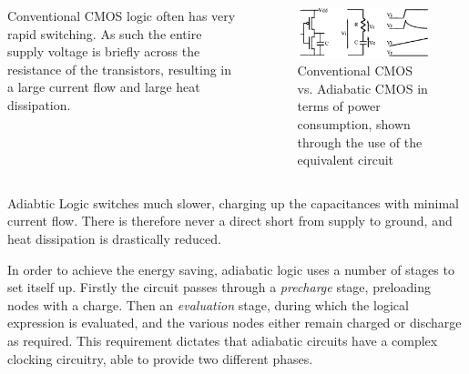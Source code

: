 \begin{columns}
	\begin{column}{0.49\textwidth}
		Conventional CMOS logic often has very rapid switching.
		As such the entire supply voltage is briefly across the resistance of the transistors, resulting in a large current flow and large heat dissipation.
	\end{column}
	\begin{column}{0.49\textwidth}
\begin{figure}
	\centering
	\includegraphics[width=\columnwidth]{../../images/conv_vs_adiabatic.png}
	\caption{Conventional CMOS vs. Adiabatic CMOS in terms of power consumption, shown through the use of the equivalent circuit \cite{DynAdiabatic} }
	\label{fig:convvsadia}
\end{figure}
	\end{column}
\end{columns}

Adiabtic Logic switches much slower, charging up the capacitances with minimal current flow.
There is therefore never a direct short from supply to ground, and heat dissipation is drastically reduced.

In order to achieve the energy saving, adiabatic logic uses a number of stages to set itself up.
Firstly the circuit passes through a \emph{precharge} stage, preloading nodes with a charge.
Then an \emph{evaluation} stage, during which the logical expression is evaluated, and the various nodes either remain charged or discharge as required.
This requirement dictates that adiabatic circuits have a complex clocking circuitry, able to provide two different phases.

